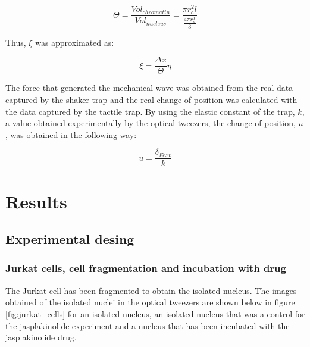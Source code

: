 \documentclass[12pt, a4paper]{article} %
\begin{document}
\begin{equation} \label{eqn:frac_nucl_chro}
	\Theta = \frac{Vol_{chromatin}}{Vol_{nucleus}} = \frac{\pi r_{c}^{2} l}{\frac{4\pi r_{n}^{3}}{3}}
\end{equation}

Thus, $\xi$ was approximated as:

\begin{equation} \label{eqn:xi_approx}
	\xi = \frac{\Delta x}{\Theta} \eta
\end{equation}

The force that generated the mechanical wave was obtained from the real data captured by the shaker trap and the real change of position was calculated with the data captured by the tactile trap. By using the elastic constant of the trap, $k$, a value obtained experimentally by the optical tweezers, the change of position, $u$, was obtained in the following way:

\begin{equation} \label{eqn:real_desp}
	u = \frac{\delta_{Fext}}{k}
\end{equation}

\newpage


\section{Results}

\setlength{\parskip}{0mm}

\subsection{Experimental desing}

\subsubsection{Jurkat cells, cell fragmentation and incubation with drug}

The Jurkat cell has been fragmented to obtain the isolated nucleus. The images obtained of the isolated nuclei in the optical tweezers are shown below in figure \ref{fig:jurkat_cells} for an isolated nucleus, an isolated nucleus that was a control for the jasplakinolide experiment and a nucleus that has been incubated with the jasplakinolide drug.
\end{document}
